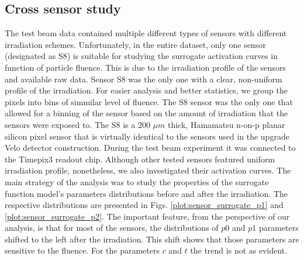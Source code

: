 \subsection{Cross sensor study}
The test beam data contained multiple different types of sensors with different irradiation schemes.
Unfortunately, in the entire dataset, only one sensor (designated as S8) is suitable for studying the surrogate activation curves in function of particle fluence.
This is due to the irradiation profile of the sensors and available raw data.
Sensor S8 was the only one with a clear, non-uniform profile of the irradiation.
For easier analysis and better statistics, we group the pixels into bins of simmilar level of fluence.
The S8 sensor was the only one that allowed for a binning of the sensor based on the amount of irradiation that the sensors were exposed to. The S8 is a 200 $\mu m$ thick, Hamamatsu n-on-p planar silicon pixel sensor that is virtually identical to the sensors used in the upgrade Velo detector construction. During the test beam experiment it was connected to the Timepix3 readout chip.
Although other tested sensors featured uniform irradiation profile, nonetheless, we also investigated their activation curves. 
The main strategy of the analysis was to study the properties of the surrogate function model's parameters distributions before and after the irradiation. 
The respective distributions are presented in Figs. \ref{plot:sensor_surrogate_p1}  and \ref{plot:sensor_surrogate_p2}.
The important feature, from the perspective of our analysis, is that for most of the sensors, the distributions of $p0$ and $p1$ parameters shifted to the left after the irradiation. This shift shows that those parameters are sensitive to the fluence.
For the parameters $c$ and $t$ the trend is not as evident.

